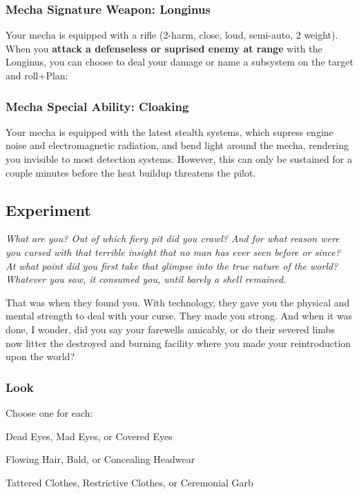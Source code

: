 \subsubsection{Mecha Signature Weapon: Longinus}
Your mecha is equipped with a rifle (2-harm, close, loud, semi-auto, 2 weight). When you \textbf{attack a defenseless or suprised enemy at range} with the Longinus, you can choose to deal your damage or name a subsystem on the target and roll+Plan:

\subsubsection{Mecha Special Ability: Cloaking}
Your mecha is equipped with the latest stealth systems, which supress engine noise and electromagnetic radiation, and bend light around the mecha, rendering you invisible to most detection systems. However, this can only be sustained for a couple minutes before the heat buildup threatens the pilot.



\subsection{Experiment}
{\itshape What \emph{are} you? Out of which fiery pit did you crawl?
  And for what reason were you cursed with that terrible insight that
  no man has ever seen before or since? At what point did you first
  take that glimpse into the true nature of the world?  Whatever you
  saw, it consumed you, until barely a shell remained.

That was when they found you. With technology, they gave you the
physical and mental strength to deal with your curse. They made you
strong. And when it was done, I wonder, did you say your farewells
amicably, or do their severed limbs now litter the destroyed and
burning facility where you made your reintroduction upon the world?}

\subsubsection{Look}
Choose one for each:

Dead Eyes, Mad Eyes, or Covered Eyes

Flowing Hair, Bald, or Concealing Headwear

Tattered Clothes, Restrictive Clothes, or Ceremonial Garb

